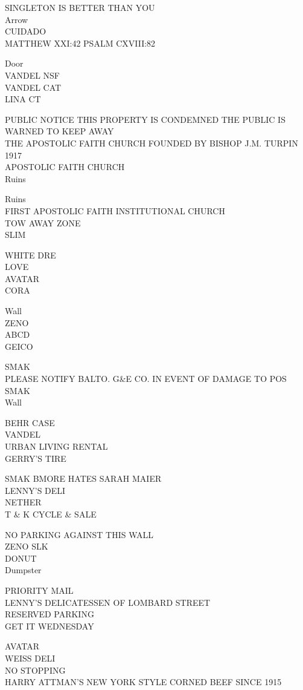 \documentclass[10pt,letterpaper]{article}
\begin{document}
SINGLETON IS BETTER THAN YOU\\
Arrow\\
CUIDADO\\
MATTHEW XXI:42 PSALM CXVIII:82

Door\\
VANDEL NSF\\
VANDEL CAT\\
LINA CT

PUBLIC NOTICE THIS PROPERTY IS CONDEMNED THE PUBLIC IS WARNED TO KEEP AWAY\\
THE APOSTOLIC FAITH CHURCH FOUNDED BY BISHOP J.M. TURPIN 1917\\
APOSTOLIC FAITH CHURCH\\
Ruins

Ruins\\
FIRST APOSTOLIC FAITH INSTITUTIONAL CHURCH\\
TOW AWAY ZONE\\
SLIM

WHITE DRE\\
LOVE\\
AVATAR\\
CORA

Wall\\
ZENO\\
ABCD\\
GEICO

SMAK\\
PLEASE NOTIFY BALTO. G\&E CO. IN EVENT OF DAMAGE TO POS\\
SMAK\\
Wall

BEHR CASE\\
VANDEL\\
URBAN LIVING RENTAL\\
GERRY'S TIRE

SMAK BMORE HATES SARAH MAIER\\
LENNY'S DELI\\
NETHER\\
T \& K CYCLE \& SALE

NO PARKING AGAINST THIS WALL\\
ZENO SLK\\
DONUT\\
Dumpster

PRIORITY MAIL\\
LENNY'S DELICATESSEN OF LOMBARD STREET\\
RESERVED PARKING\\
GET IT WEDNESDAY

AVATAR\\
WEISS DELI\\
NO STOPPING\\
HARRY ATTMAN'S NEW YORK STYLE CORNED BEEF SINCE 1915
\end{document}

